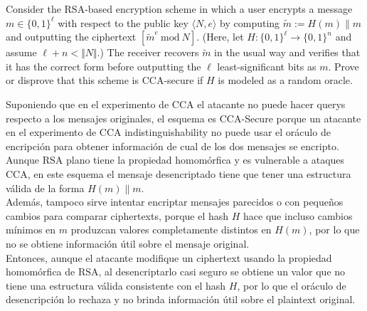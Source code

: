 \documentclass[12pt,addpoints,answers]{exam}
\begin{document}
\begin{questions}
\question[10] Consider the RSA-based encryption scheme in which a user encrypts a message $m\in\{0,1\}^\ell$ with respect to the public key $\langle N,e\rangle$ by computing $\tilde{m}:=H(m)\parallel m$ and outputting the ciphertext $[\tilde{m}^e~\mathrm{mod}~N]$. (Here, let $H:\{0,1\}^\ell\rightarrow\{0,1\}^n$ and assume $\ell+n<\Vert N\Vert$.) The receiver recovers $\tilde{m}$ in the usual way and verifies that it has the correct form before outputting the $\ell$ least-significant bits as $m$. Prove or disprove that this scheme is CCA-secure if $H$ is modeled as a random oracle.
\begin{solution}
    Suponiendo que en el experimento de CCA el atacante no puede hacer querys respecto a los mensajes originales, el esquema es CCA-Secure porque un atacante en el experimento de CCA indistinguishability no puede usar el oráculo de encripción para obtener información de cual de los dos mensajes se encripto. Aunque RSA plano tiene la propiedad homomórfica y es vulnerable a ataques CCA, en este esquema el mensaje desencriptado tiene que tener una estructura válida de la forma $H(m) \parallel m$. \\

    Además, tampoco sirve intentar encriptar mensajes parecidos o con pequeños cambios para comparar ciphertexts, porque el hash $H$ hace que incluso cambios mínimos en $m$ produzcan valores completamente distintos en $H(m)$, por lo que no se obtiene información útil sobre el mensaje original. \\

    Entonces, aunque el atacante modifique un ciphertext usando la propiedad homomórfica de RSA, al desencriptarlo casi seguro se obtiene un valor que no tiene una estructura válida consistente con el hash $H$, por lo que el oráculo de desencripción lo rechaza y no brinda información útil sobre el plaintext original.
\end{solution}



\end{questions}
\end{document}
